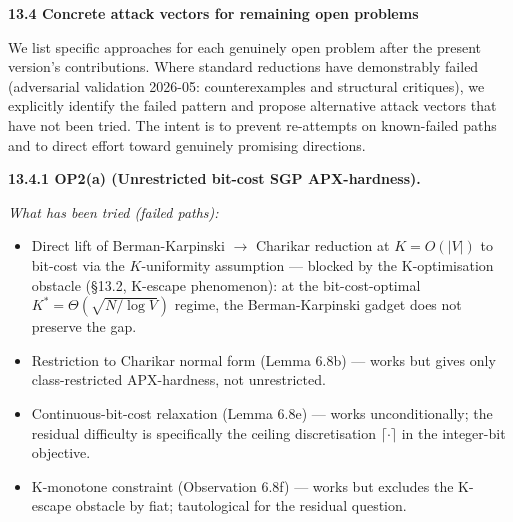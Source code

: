 \documentclass[
]{article}
\begin{document}
\textbf{13.4 Concrete attack vectors for remaining open problems}

We list specific approaches for each genuinely open problem after the
present version's contributions. Where standard reductions have
demonstrably failed (adversarial validation 2026-05: counterexamples and structural critiques), we explicitly
identify the failed pattern and propose alternative attack vectors
that have not been tried. The intent is to prevent re-attempts on
known-failed paths and to direct effort toward genuinely promising
directions.

\textbf{13.4.1 OP2(a) (Unrestricted bit-cost SGP APX-hardness).}

\emph{What has been tried (failed paths):}
\begin{itemize}
\item Direct lift of Berman-Karpinski $\to$ Charikar reduction at
$K = O(|V|)$ to bit-cost via the $K$-uniformity assumption ---
blocked by the K-optimisation obstacle (§13.2, K-escape phenomenon):
at the bit-cost-optimal $K^* = \Theta(\sqrt{N/\log V})$ regime, the
Berman-Karpinski gadget does not preserve the gap.
\item Restriction to Charikar normal form (Lemma 6.8b) --- works but
gives only class-restricted APX-hardness, not unrestricted.
\item Continuous-bit-cost relaxation (Lemma 6.8e) --- works
unconditionally; the residual difficulty is specifically the
ceiling discretisation $\lceil \cdot \rceil$ in the integer-bit
objective.
\item K-monotone constraint (Observation 6.8f) --- works but excludes
the K-escape obstacle by fiat; tautological for the residual question.
\end{itemize}
\end{document}
